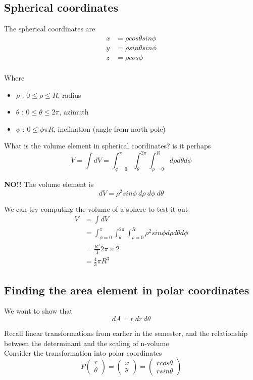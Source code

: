 \subsection{Spherical coordinates}

The spherical coordinates are 
\begin{align*}
   x &= \rho cos \theta sin \phi \\ 
   y &= \rho sin \theta sin \phi \\
   z &= \rho cos \phi \\
\end{align*}

Where
\begin{itemize}
   \item $\rho$ : $0 \leq \rho \leq R$, radius
   \item $\theta$ : $0 \leq \theta \leq 2 \pi$, azimuth
   \item $\phi$ : $0 \leq \phi \pi R$, inclination (angle from north pole)
\end{itemize}

What is the volume element in spherical coordinates? is it perhaps
\[
  V = \int dV = \int_{ \phi = 0 }^{ \pi}  \int_{ \theta}^{2 \pi} \int_{ \rho = 0}^{R}   d \rho d \theta d \phi
\]  

\textbf{NO!!} The volume element is 
\[
  dV = \rho^2 sin \phi\ d \rho\ d \phi\ d \theta
\] 

We can try computing the volume of a sphere to test it out
\begin{align*}
   V &= \int dV \\
     &= \int_{ \phi = 0 }^{ \pi}  \int_{ \theta}^{2 \pi} \int_{ \rho = 0}^{R}  \rho^2 sin \phi  d \rho d \theta d \phi \\
     &= \frac{R^3}{3} 2 \pi  \times 2 \\
     &= \frac{4}{3} \pi R^3
\end{align*}

\subsection{Finding the area element in polar coordinates}

We want to show that \[
  dA = r\ dr \ d \theta
\] 

Recall linear transformations from earlier in the semester, and the relationship between the determinant and the scaling of n-volume\\

Consider the transformation into polar coordinates
\[
  P \begin{pmatrix}  r \\ \theta \end{pmatrix} = \begin{pmatrix}  x \\ y \end{pmatrix}  = \begin{pmatrix}  r cos \theta \\ r sin \theta \end{pmatrix} 
\] 

